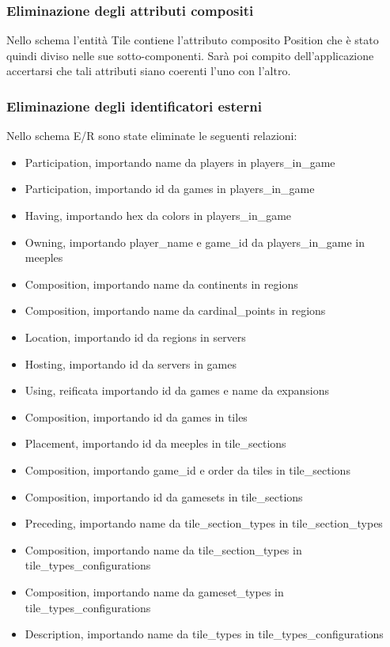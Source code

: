 \subsubsection*{Eliminazione degli attributi compositi}
Nello schema l'entità Tile contiene l'attributo composito Position che è stato quindi diviso nelle sue sotto-componenti. Sarà poi compito dell'applicazione accertarsi che tali attributi siano coerenti l'uno con l'altro.
\medskip

\subsubsection*{Eliminazione degli identificatori esterni}
Nello schema E/R sono state eliminate le seguenti relazioni:
\begin{itemize}
    \item Participation, importando name da players in players\_in\_game
    \item Participation, importando id da games in players\_in\_game
    \item Having, importando hex da colors in players\_in\_game
    \item Owning, importando player\_name e game\_id da players\_in\_game in meeples
    \item Composition, importando name da continents in regions
    \item Composition, importando name da cardinal\_points in regions
    \item Location, importando id da regions in servers
    \item Hosting, importando id da servers in games
    \item Using, reificata importando id da games e name da expansions
    \item Composition, importando id da games in tiles
    \item Placement, importando id da meeples in tile\_sections
    \item Composition, importando game\_id e order da tiles in tile\_sections
    \item Composition, importando id da gamesets in tile\_sections
    \item Preceding, importando name da tile\_section\_types in tile\_section\_types
    \item Composition, importando name da tile\_section\_types in tile\_types\_configurations
    \item Composition, importando name da gameset\_types in tile\_types\_configurations
    \item Description, importando name da tile\_types in tile\_types\_configurations

\end{itemize}

